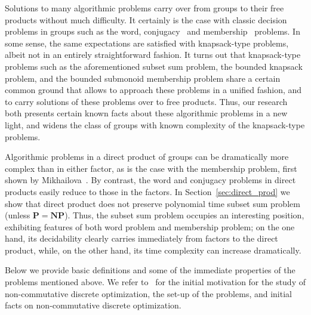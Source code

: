 \documentclass[10pt]{amsart}
\newcommand{\an}{\noindent\color{red} Andrey: }{}
\newcommand{\li}{\noindent\color{blue} Liza: }{}
\theoremstyle{definition}
\def\P{{\mathbf{P}}}
\def\NP{{\mathbf{NP}}}
\begin{document}
Solutions to many algorithmic problems carry over from groups to their free products without much difficulty. It certainly is the case with classic decision problems in groups such as the word, conjugacy~\cite{Lyndon-Schupp:2001} and membership~\cite{Mikhailova_68} problems. In some sense, the same expectations are satisfied with knapsack-type problems, albeit not in an entirely straightforward fashion. It turns out that knapsack-type problems such as the aforementioned subset sum problem, the bounded knapsack problem, and the bounded submonoid membership problem share a certain common ground that allows to approach these problems in a unified fashion, and to carry solutions of these problems over to free products. Thus, our research both presents certain known facts about these algorithmic problems in a new light, and widens the class of groups with known complexity of the knapsack-type problems.

Algorithmic problems in a direct product of groups can be dramatically more complex than in either factor, as is the case with the membership problem, first shown by Mikhailova~\cite{Mikhailova}. By contrast, the word and conjugacy problems in direct products easily reduce to those in the factors. %
In Section~\ref{sec:direct_prod} we show that direct product does not preserve polynomial time subset sum problem (unless $\P=\NP$). Thus, the subset sum problem occupies an interesting position, exhibiting features of both word problem and membership problem; on the one hand, its decidability clearly carries immediately from factors to the direct product, while, on the other hand, its time complexity can increase dramatically. %


Below we provide basic definitions and some of the immediate properties of the problems mentioned above.
We refer to~\cite{Miasnikov-Nikolaev-Ushakov:2014a,Miasnikov-Nikolaev-Ushakov:2014b} for the initial motivation for the study of non-commutative discrete optimization, the set-up of the problems, and initial facts on non-commutative discrete optimization.
\end{document}
